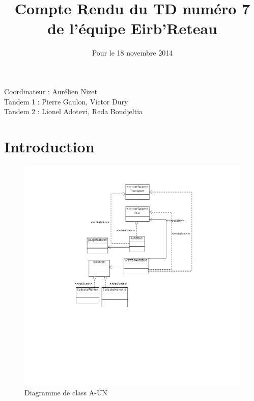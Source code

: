 \documentclass[a4paper,11pt]{article}
\begin{document}
\title{Compte Rendu du TD numéro 7 de l'équipe Eirb'Reteau}
\date{Pour le 18 novembre 2014}
\maketitle

\begin{center}
  Coordinateur : Aurélien Nizet \\
  Tandem 1 : Pierre Gaulon, Victor Dury \\
  Tandem 2 : Lionel Adotevi, Reda Boudjeltia  \\
\end{center}
\maketitle
\section{Introduction}





\begin{figure}

    \caption{Diagramme de class A-UN}
    \includegraphics[scale=0.4]{a-un.png}

\end{figure}
\end{document}

